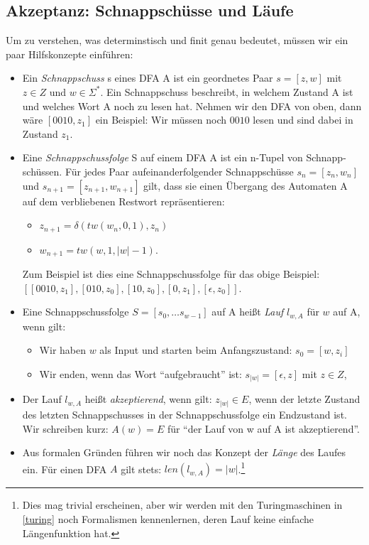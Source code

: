 \subsection{Akzeptanz: Schnappschüsse und Läufe}
Um zu verstehen, was determinstisch und finit genau bedeutet,
müssen wir ein paar Hilfskonzepte einführen:
\begin{itemize}
    \item Ein \emph{Schnappschuss} s eines DFA A ist ein geordnetes Paar $s = [z, w]$
        mit $z \in Z$ und $w \in \Sigma^*$.
        Ein Schnappschuss beschreibt,
        in welchem Zustand A ist und welches Wort A noch zu lesen hat.
        Nehmen wir den DFA von oben, dann wäre $[0010,z_1]$ ein Beispiel:
        Wir müssen noch $0010$ lesen und sind dabei in Zustand $z_1$.
    \item Eine \emph{Schnappschussfolge} S auf einem DFA A
        ist ein n-Tupel von Schnapp-schüssen. 
        Für jedes Paar aufeinanderfolgender Schnappschüsse $s_n = [z_n, w_n]$
        und $s_{n+1} = [z_{n+1}, w_{n+1}]$ gilt,
        dass sie einen Übergang des Automaten A auf dem verbliebenen Restwort repräsentieren:
        \begin{itemize}
            \item $z_{n+1} = \delta(tw(w_{n},0,1), z_n)$
            \item $w_{n+1} = tw(w,1,|w|-1)$.
        \end{itemize}
        Zum Beispiel ist dies eine Schnappschussfolge für das obige Beispiel:\linebreak
        $[[0010,z_1],[010, z_0],[10, z_0],[0,z_1],[\epsilon,z_0]]$.
    \item Eine Schnappschussfolge $S = [s_0, \ldots s_{w-1}]$ auf A
        heißt \emph{Lauf} $l_{w,A}$ für $w$ auf A, wenn gilt:
        \begin{itemize}
            \item Wir haben $w$ als Input und starten beim Anfangszustand:
                $s_0 = [w,z_i]$ 
            \item Wir enden, wenn das Wort ``aufgebraucht'' ist:
                $s_{|w|} = [\epsilon, z]$ mit $z \in Z$,

        \end{itemize}
    \item Der Lauf $l_{w,A}$ heißt \emph{akzeptierend}, wenn gilt:
        $z_{|w|} \in E$,
        wenn der letzte Zustand des letzten Schnappschusses in der Schnappschussfolge
        ein Endzustand ist.
        Wir schreiben kurz: $A(w) = E$
        für ``der Lauf von w auf A ist akzeptierend''. 
    \item Aus formalen Gründen führen wir noch das Konzept der \emph{Länge} des Laufes ein.
        Für einen DFA $A$ gilt stets: $len(l_{w,A}) = |w|$.\footnote{
        Dies mag trivial erscheinen,
        aber wir werden mit den Turingmaschinen in \autoref{turing} 
        noch Formalismen kennenlernen, deren Lauf keine einfache Längenfunktion hat.} 

\end{itemize}

